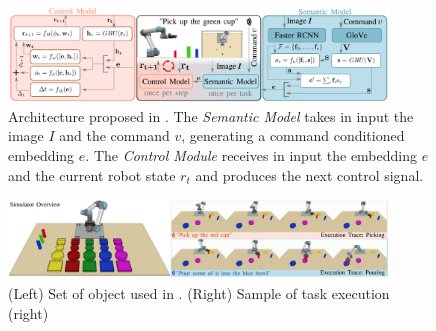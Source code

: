 \begin{figure}[t]
    \centering
    \includegraphics[width=0.9\textwidth]{figures/images/language_conditioned/architecture.png}
    \caption{Architecture proposed in \cite{stepputtis2020language}. The \textit{Semantic Model} takes in input the image $I$ and the command $v$, generating a command conditioned embedding $e$. The \textit{Control Module} receives in input the embedding $e$ and the current robot state $r_{t}$ and produces the next control signal.}
    \label{fig:language_conditioned}
\end{figure}

\begin{figure}[t]
    \centering
    \includegraphics[width=0.9\textwidth]{figures/images/language_conditioned/objects.png}
    \caption{(Left) Set of object used in \cite{stepputtis2020language}. (Right) Sample of task execution (right)}
    \label{fig:objects}
\end{figure}
